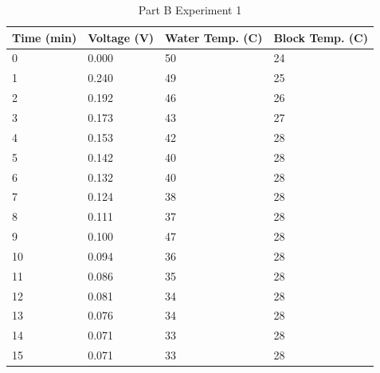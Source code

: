 \documentclass[a4paper, 12pt, english]{article}
\begin{document}
\begin{table}[H]
	\centering
	\caption{Part B Experiment 1}
	\label{tab:partB1}
	\begin{tabular}{@{}llll@{}}
		\toprule
		\textbf{Time (min)} & \textbf{Voltage (V)} & \textbf{Water Temp. (\degree C)} & \textbf{Block Temp. (\degree C)} \\ \midrule
		0                   & 0.000                & 50                               & 24                               \\
		1                   & 0.240                & 49                               & 25                               \\
		2                   & 0.192                & 46                               & 26                               \\
		3                   & 0.173                & 43                               & 27                               \\
		4                   & 0.153                & 42                               & 28                               \\
		5                   & 0.142                & 40                               & 28                               \\
		6                   & 0.132                & 40                               & 28                               \\
		7                   & 0.124                & 38                               & 28                               \\
		8                   & 0.111                & 37                               & 28                               \\
		9                   & 0.100                & 47                               & 28                               \\
		10                  & 0.094                & 36                               & 28                               \\
		11                  & 0.086                & 35                               & 28                               \\
		12                  & 0.081                & 34                               & 28                               \\
		13                  & 0.076                & 34                               & 28                               \\
		14                  & 0.071                & 33                               & 28                               \\
		15                  & 0.071                & 33                               & 28                               \\ \bottomrule
	\end{tabular}
\end{table}
\end{document}
